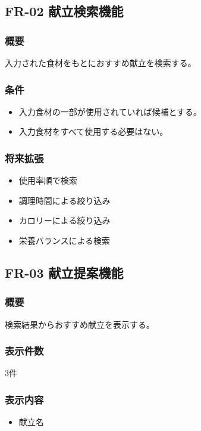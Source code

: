 \documentclass[a4paper,12pt]{jarticle}
\begin{document}
\subsection{FR-02 献立検索機能}

\subsubsection*{概要}
入力された食材をもとにおすすめ献立を検索する。

\subsubsection*{条件}
\begin{itemize}
    \item 入力食材の一部が使用されていれば候補とする。
    \item 入力食材をすべて使用する必要はない。
\end{itemize}

\subsubsection*{将来拡張}
\begin{itemize}
    \item 使用率順で検索
    \item 調理時間による絞り込み
    \item カロリーによる絞り込み
    \item 栄養バランスによる検索
\end{itemize}

\subsection{FR-03 献立提案機能}

\subsubsection*{概要}
検索結果からおすすめ献立を表示する。

\subsubsection*{表示件数}
3件

\subsubsection*{表示内容}
\begin{itemize}
    \item 献立名
\end{itemize}
\end{document}
